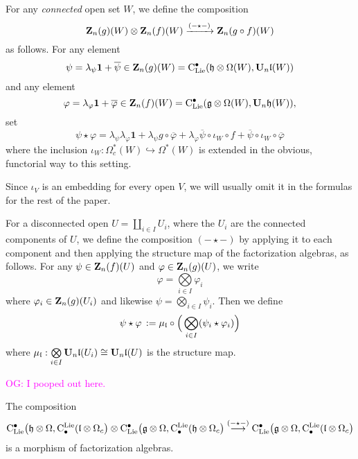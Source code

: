 \documentclass[11pt]{amsart}
\numberwithin{equation}{section}
\def\owen{\textcolor{magenta}{OG: }\textcolor{magenta}}
\begin{document}
\begin{dfn}\label{def:comp}
For any \emph{connected} open set $W$, we define the composition 
\[
\mathbf Z_n(g)(W) \otimes \mathbf Z_n(f)(W) \xrightarrow{(-\star-)} \mathbf Z_n(g \circ f)(W)
\]
as follows.
For any element
\[
\psi=\lambda_\psi \mathbf{1} +\overline{\psi} \in \mathbf Z_n(g)(W) = {\rm C}_{\rm Lie}^\bullet(\mathfrak h \otimes \Omega(W), \mathbf U_n \mathfrak l (W)  )
\]
and any element
\[
\varphi =\lambda_\varphi \mathbf{1} +\overline{\varphi}\in \mathbf Z_n(f)(W) = {\rm C}_{\rm Lie}^\bullet(\mathfrak g \otimes \Omega(W), \mathbf U_n \mathfrak h (W)  ),
\] 
set
\[
\psi \star \varphi =  \lambda_{\psi} \lambda_{\varphi} \mathbf{1}+
\lambda_\psi g\circ \overline{\varphi} + \lambda_{\varphi} \overline{\psi} \circ \iota_W \circ f +\overline{\psi} \circ \iota_W \circ \overline{\varphi} 
\]
where the inclusion $\iota_W: \Omega^*_c(W) \hookrightarrow \Omega^*(W)$ is extended in the obvious, functorial way to this setting.
\end{dfn}

Since $\iota_V$ is an embedding for every open $V$, 
we will usually omit it in the formulas for the rest of the paper.

For a disconnected open $U=\coprod\limits_{i\in I}U_i$, 
where the $U_i$ are the connected components of $U$,  
we define the composition $(-\star-)$ by applying it to each component and then applying the structure map of the factorization algebras,
as follows.
For any $\psi \in \mathbf Z_n(f)(U)$ and $\varphi \in \mathbf Z_n(g)(U)$,
we write 
\[
\varphi = \mathop{\bigotimes}\limits_{i\in I} \varphi_i
\]
where $\varphi_i \in \mathbf Z_n(g)(U_i)$ and likewise $\psi= \mathop{\bigotimes}\limits_{i\in I} \psi_i$.
Then we define
\begin{equation} 
\label{eqdef:staronnonconnected}
\psi \star \varphi \, := \mu_{\mathfrak l} \circ \Big( \bigotimes\limits_{i\in I} (\psi_i \star \varphi_i)\Big) 
\end{equation}
where $\mu_{\mathfrak l}: \mathop{\bigotimes}\limits_{i\in I} \mathbf U_n \mathfrak l (U_i) \cong \mathbf U_n \mathfrak l (U)$ 
is the structure map. 

\owen{I pooped out here.}

\begin{lmm}
\label{L:compisfacmap} 
The composition $${\rm C}_{\rm Lie}^\bullet\big(\mathfrak h \otimes \Omega, {\rm C}^{\rm Lie}_\bullet(\mathfrak l \otimes \Omega_c  \big) \otimes 
{\rm C}_{\rm Lie}^\bullet\big(\mathfrak g \otimes \Omega, {\rm C}^{\rm Lie}_\bullet(\mathfrak h \otimes \Omega_c  \big)
\stackrel{(-\star-)}\longrightarrow 
{\rm C}_{\rm Lie}^\bullet\big(\mathfrak g \otimes \Omega, {\rm C}^{\rm Lie}_\bullet(\mathfrak l \otimes \Omega_c  \big)
$$
 is a morphism of factorization algebras.
\end{lmm}
\end{document}
